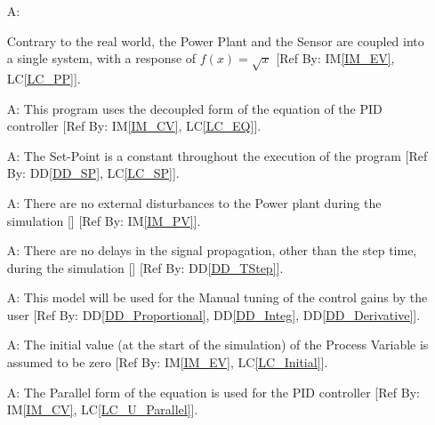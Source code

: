 \documentclass[12pt]{article}
\newcommand{\ddref}[1]{DD\ref{#1}}
\newcounter{assumpnum} %
\newcommand{\iref}[1]{IM\ref{#1}}
\newcommand{\lcref}[1]{LC\ref{#1}}
\begin{document}
\begin{itemize}

\item[A\refstepcounter{assumpnum}\theassumpnum \label{A_PP}:]
	
    Contrary to the real world, the Power Plant and the Sensor are coupled 
    into a single system, with a response of $f(x) = \sqrt{x}$ [Ref By: 
    \iref{IM_EV}, \lcref{LC_PP}].

\item[A\refstepcounter{assumpnum}\theassumpnum \label{A_EQ}:] This program uses
 the decoupled form of the equation of the PID controller [Ref By: \iref{IM_CV}, 
    \lcref{LC_EQ}].

\item[A\refstepcounter{assumpnum}\theassumpnum \label{A_SP}:] The Set-Point is 
a constant throughout the execution of the program [Ref By: \ddref{DD_SP}, 
    \lcref{LC_SP}].

\item[A\refstepcounter{assumpnum}\theassumpnum \label{A_Attn}:] There are no 
external disturbances to the Power plant during the simulation [\cite{PID_Wiki}]
[Ref By: \iref{IM_PV}].

\item[A\refstepcounter{assumpnum}\theassumpnum \label{A_Delay}:] There are no 
delays in the signal propagation, other than the step time,
during the simulation [\cite{PID_Wiki}] [Ref By: \ddref{DD_TStep}].

\item[A\refstepcounter{assumpnum}\theassumpnum \label{A_Tuning}:] This model 
will be used for the Manual tuning of the control gains by the user 
[Ref By: \ddref{DD_Proportional}, \ddref{DD_Integ}, \ddref{DD_Derivative}].

\item[A\refstepcounter{assumpnum}\theassumpnum \label{A_Initial}:] The initial
value (at the start of the simulation) of the Process Variable is assumed to be 
zero [Ref By: \iref{IM_EV}, \lcref{LC_Initial}].

\item[A\refstepcounter{assumpnum}\theassumpnum \label{A_Parallel}:] The Parallel
form of the equation is used for the PID controller 
[Ref By: \iref{IM_CV}, \lcref{LC_U_Parallel}].

\end{itemize}
\end{document}
